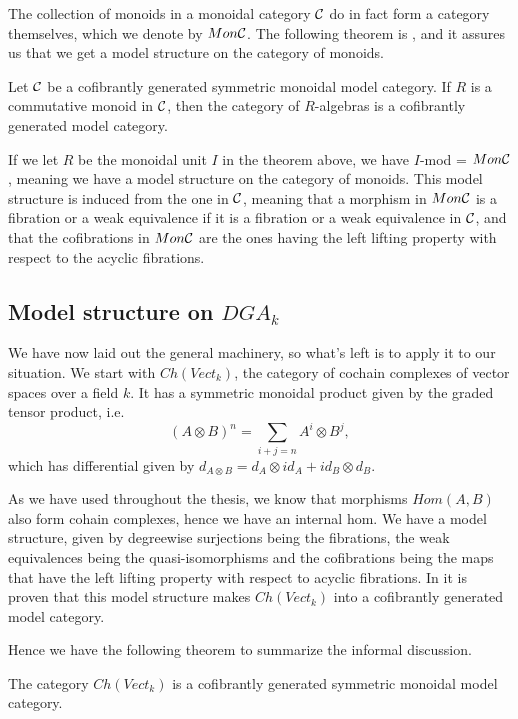 The collection of monoids in a monoidal category $\mathcal{C}$ do in fact form a category themselves, which we denote by $Mon\mathcal{C}$. The following theorem is \cite[Theorem 4.1 (3)]{monoid}, and it assures us that we get a model structure on the category of monoids.

\begin{theorem}
Let $\mathcal{C}$ be a cofibrantly generated symmetric monoidal model category. If $R$ is a commutative monoid in $\mathcal{C}$, then the category of $R$-algebras is a cofibrantly generated model category. 
\end{theorem}

If we let $R$ be the monoidal unit $I$ in the theorem above, we have $I$-mod = $Mon\mathcal{C}$, meaning we have a model structure on the category of monoids. This model structure is induced from the one in $\mathcal{C}$, meaning that a morphism in $Mon\mathcal{C}$ is a fibration or a weak equivalence if it is a fibration or a weak equivalence in $\mathcal{C}$, and that the cofibrations in $Mon\mathcal{C}$ are the ones having the left lifting property with respect to the acyclic fibrations. 

\subsection*{Model structure on $DGA_k$}

We have now laid out the general machinery, so what's left is to apply it to our situation. We start with $Ch(Vect_k)$, the category of cochain complexes of vector spaces over a field $k$. It has a symmetric monoidal product given by the graded tensor product, i.e.
\begin{equation*}
    (A\otimes B)^n = \sum_{i+j=n} A^i \otimes B^j , 
\end{equation*}
which has differential given by $d_{A\otimes B} = d_A\otimes id_A + id_B\otimes d_B$. 

As we have used throughout the thesis, we know that morphisms $Hom(A, B)$ also form cohain complexes, hence we have an internal hom. We have a model structure, given by degreewise surjections being the fibrations, the weak equivalences being the quasi-isomorphisms and the cofibrations being the maps that have the left lifting property with respect to acyclic fibrations. In \cite[Theorem 2.3.11]{hovey} it is proven that this model structure makes $Ch(Vect_k)$ into a cofibrantly generated model category. 

Hence we have the following theorem to summarize the informal discussion. 

\begin{theorem}
The category $Ch(Vect_k)$ is a cofibrantly generated symmetric monoidal model category.
\end{theorem}


